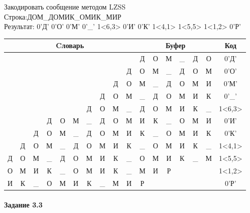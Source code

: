 \documentclass[a4paper, 12pt]{article}
\begin{document}
Закодировать сообщение методом LZSS\\
Строка:ДОМ\_ДОМИК\_ОМИК\_МИР\\
Результат: 0'Д' 0'О' 0'М' 0'\_' 1<6,3> 0'И' 0'К' 1<4,1> 1<5,5> 1<1,2> 0'Р'\\
\begin{table}[h!]
\centering
\begin{tabular}{|c|c|c|c|c|c|c|c|c|c|c|c|c|c|c|c|c|}
\hline
\multicolumn{10}{|c|}{Cловарь} & \multicolumn{6}{c|}{Буфер} & Код  \\ \hline
  &   &   &   &   &   &   &   &   &   & Д & О & М & \_ & Д & О & 0'Д'\\ \hline
  &   &   &   &   &   &   &   &   & Д & О & М & \_ & Д & О & М & 0'О'\\ \hline
  &   &   &   &   &   &   &   & Д & О & М & \_ & Д & О & М & И & 0'М'\\ \hline
  &   &   &   &   &   &   & Д & О & М & \_ & Д & О & М & И & К & 0'\_'\\ \hline
  &   &   &   &   &   & \cellcolor[HTML]{FFFF00} Д & \cellcolor[HTML]{FFFF00} О & \cellcolor[HTML]{FFFF00} М & \_ & \cellcolor[HTML]{FFFF00} Д & \cellcolor[HTML]{FFFF00} О & \cellcolor[HTML]{FFFF00} М & И & К & \_ & 1<6,3>\\ \hline
  &   &   & Д & О & М & \_ & Д & О & М & И & К & \_ & О & М & И & 0'И'\\ \hline
  &   & Д & О & М & \_ & Д & О & М & И & К & \_ & О & М & И & К & 0'К'\\ \hline
  & Д & О & М & \cellcolor[HTML]{FFFF00} \_ & Д & О & М & И & К & \cellcolor[HTML]{FFFF00} \_ & О & М & И & К & \_ & 1<4,1>\\ \hline
Д & О & М & \_ & Д & \cellcolor[HTML]{FFFF00} О & \cellcolor[HTML]{FFFF00} М & \cellcolor[HTML]{FFFF00} И & \cellcolor[HTML]{FFFF00} К & \cellcolor[HTML]{FFFF00} \_ & \cellcolor[HTML]{FFFF00} О & \cellcolor[HTML]{FFFF00} М & \cellcolor[HTML]{FFFF00} И & \cellcolor[HTML]{FFFF00} К & \cellcolor[HTML]{FFFF00} \_ & М & 1<5,5>\\ \hline
О & \cellcolor[HTML]{FFFF00} М & \cellcolor[HTML]{FFFF00} И & К & \_ & О & М & И & К & \_ & \cellcolor[HTML]{FFFF00} М & \cellcolor[HTML]{FFFF00} И & Р &   &   &   & 1<1,2>\\ \hline
И & К & \_ & О & М & И & К & \_ & М & И & Р &   &   &   &   &   & 0'Р'\\ \hline
\end{tabular}
\end{table}

\paragraph{Задание 3.3}
\end{document}
